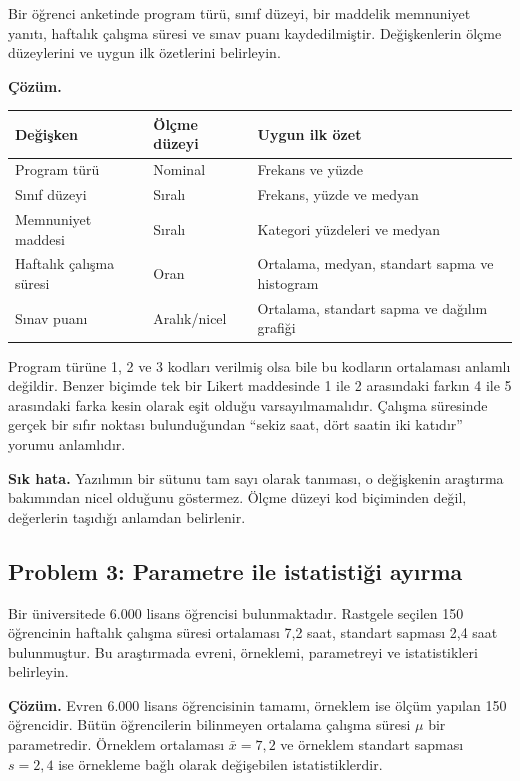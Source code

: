 Bir öğrenci anketinde program türü, sınıf düzeyi, bir maddelik memnuniyet
yanıtı, haftalık çalışma süresi ve sınav puanı kaydedilmiştir. Değişkenlerin
ölçme düzeylerini ve uygun ilk özetlerini belirleyin.

\textbf{Çözüm.}

\begin{center}
\small
\begin{tabularx}{\textwidth}{@{}p{}p{}X@{}}
\toprule
Değişken & Ölçme düzeyi & Uygun ilk özet \\
\midrule
Program türü & Nominal & Frekans ve yüzde \\
Sınıf düzeyi & Sıralı & Frekans, yüzde ve medyan \\
Memnuniyet maddesi & Sıralı & Kategori yüzdeleri ve medyan \\
Haftalık çalışma süresi & Oran & Ortalama, medyan, standart sapma ve histogram \\
Sınav puanı & Aralık/nicel & Ortalama, standart sapma ve dağılım grafiği \\
\bottomrule
\end{tabularx}
\end{center}

Program türüne 1, 2 ve 3 kodları verilmiş olsa bile bu kodların ortalaması
anlamlı değildir. Benzer biçimde tek bir Likert maddesinde 1 ile 2 arasındaki
farkın 4 ile 5 arasındaki farka kesin olarak eşit olduğu varsayılmamalıdır.
Çalışma süresinde gerçek bir sıfır noktası bulunduğundan ``sekiz saat, dört
saatin iki katıdır'' yorumu anlamlıdır.

\textbf{Sık hata.} Yazılımın bir sütunu tam sayı olarak tanıması, o değişkenin
araştırma bakımından nicel olduğunu göstermez. Ölçme düzeyi kod biçiminden
değil, değerlerin taşıdığı anlamdan belirlenir.

\subsection*{Problem 3: Parametre ile istatistiği ayırma}

Bir üniversitede 6.000 lisans öğrencisi bulunmaktadır. Rastgele seçilen 150
öğrencinin haftalık çalışma süresi ortalaması 7,2 saat, standart sapması 2,4
saat bulunmuştur. Bu araştırmada evreni, örneklemi, parametreyi ve
istatistikleri belirleyin.

\textbf{Çözüm.} Evren 6.000 lisans öğrencisinin tamamı, örneklem ise ölçüm
yapılan 150 öğrencidir. Bütün öğrencilerin bilinmeyen ortalama çalışma süresi
$\mu$ bir parametredir. Örneklem ortalaması $\bar{x}=7{,}2$ ve örneklem
standart sapması $s=2{,}4$ ise örnekleme bağlı olarak değişebilen
istatistiklerdir.


